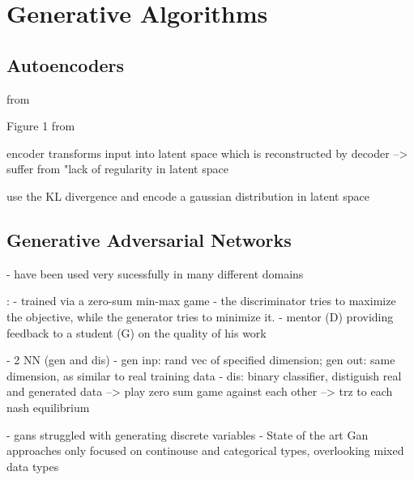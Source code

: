 \section{Generative Algorithms}
\label{ch:preliminaries-generativeAlgorithms}

\subsection{Autoencoders}
\label{ch:preliminaries-generativeAlgorithms-variationalAutoencoders}

from \cite{kingma2013AutoEncodingVariationalBayes}

Figure 1 from \cite{razghandi2022VariationalAutoencoderGenerativea}

encoder transforms input into latent space which is reconstructed by decoder \cite{razghandi2022VariationalAutoencoderGenerativea}
--> suffer from "lack of regularity in latent space \cite{razghandi2022VariationalAutoencoderGenerativea}

use the KL divergence and encode a gaussian distribution in latent space \cite{razghandi2022VariationalAutoencoderGenerativea}


\subsection{Generative Adversarial Networks}
\label{ch:preliminaries-generativeAlgorithms-generativeAdversarialNetworks}

\cite{goodfellow2020GenerativeAdversarialNetworks}
- have been used very sucessfully in many different domains \cite{li2022TTSGANTransformerbasedTimeSeries}
 

\cite{zhao2022CTABGANEnhancingTabular}:
- trained via a zero-sum min-max game 
- the discriminator tries to maximize the objective, while the generator tries to minimize it.
- mentor (D) providing feedback to a student (G) on the quality of his work


\cite{li2022TTSGANTransformerbasedTimeSeries}
- 2 NN (gen and dis)
- gen inp: rand vec of specified dimension; gen out: same dimension, as similar to real training data
- dis: binary classifier, distiguish real and generated data
--> play zero sum game against each other
--> trz to each nash equilibrium

- gans struggled with generating discrete variables \cite{torfi2020CorGANCorrelationCapturingConvolutionala}
- State of the art Gan approaches only focused on continouse and categorical types, overlooking mixed data types \cite{zhao2022CTABGANEnhancingTabular}


